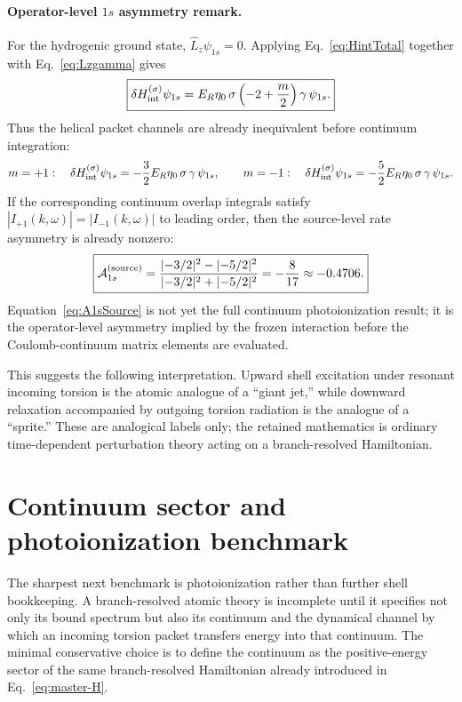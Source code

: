 \documentclass[11pt,a4paper]{article}
\begin{document}
\paragraph{Operator-level $1s$ asymmetry remark.}
For the hydrogenic ground state, $\hat L_z\psi_{1s}=0$. Applying Eq.~\eqref{eq:HintTotal} together with Eq.~\eqref{eq:Lzgamma} gives
\begin{equation}
\label{eq:Hint1s}
\boxed{
\delta H_{\rm int}^{(\sigma)}\psi_{1s}
=
E_R\eta_0\,\sigma\left(-2+\frac{m}{2}\right)\gamma\,\psi_{1s}.
}
\end{equation}
Thus the helical packet channels are already inequivalent before continuum integration:
\begin{equation}
\label{eq:Hint1sPm}
 m=+1:\quad \delta H_{\rm int}^{(\sigma)}\psi_{1s}=-\frac{3}{2}E_R\eta_0\,\sigma\,\gamma\,\psi_{1s},
 \qquad
 m=-1:\quad \delta H_{\rm int}^{(\sigma)}\psi_{1s}=-\frac{5}{2}E_R\eta_0\,\sigma\,\gamma\,\psi_{1s}.
\end{equation}
If the corresponding continuum overlap integrals satisfy $|I_{+1}(k,\omega)|=|I_{-1}(k,\omega)|$ to leading order, then the source-level rate asymmetry is already nonzero:
\begin{equation}
\label{eq:A1sSource}
\boxed{
\mathcal A_{1s}^{\rm(source)}
=
\frac{|{-3}/{2}|^2-|{-5}/{2}|^2}{|{-3}/{2}|^2+|{-5}/{2}|^2}
=
-\frac{8}{17}
\approx -0.4706.
}
\end{equation}
Equation~\eqref{eq:A1sSource} is not yet the full continuum photoionization result; it is the operator-level asymmetry implied by the frozen interaction before the Coulomb-continuum matrix elements are evaluated.

This suggests the following interpretation. Upward shell excitation under resonant incoming torsion is the atomic analogue of a ``giant jet,'' while downward relaxation accompanied by outgoing torsion radiation is the analogue of a ``sprite.'' These are analogical labels only; the retained mathematics is ordinary time-dependent perturbation theory acting on a branch-resolved Hamiltonian.

\section{Continuum sector and photoionization benchmark}
The sharpest next benchmark is photoionization rather than further shell bookkeeping. A branch-resolved atomic theory is incomplete until it specifies not only its bound spectrum but also its continuum and the dynamical channel by which an incoming torsion packet transfers energy into that continuum. The minimal conservative choice is to define the continuum as the positive-energy sector of the same branch-resolved Hamiltonian already introduced in Eq.~\eqref{eq:master-H}.
\end{document}
